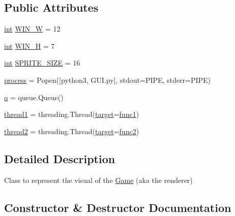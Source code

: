 \subsection*{Public Attributes}
\begin{DoxyCompactItemize}
\item 
\mbox{\hyperlink{warnings_8h_a74f207b5aa4ba51c3a2ad59b219a423b}{int}} \mbox{\hyperlink{class_game_a6af3a4730712fed523037d4a2cf0beab}{W\+I\+N\+\_\+W}} = 12
\item 
\mbox{\hyperlink{warnings_8h_a74f207b5aa4ba51c3a2ad59b219a423b}{int}} \mbox{\hyperlink{class_game_a59e081cafbf5991c96838c09806319f9}{W\+I\+N\+\_\+H}} = 7
\item 
\mbox{\hyperlink{warnings_8h_a74f207b5aa4ba51c3a2ad59b219a423b}{int}} \mbox{\hyperlink{class_game_a54d3bb2d75dd10ce20a72da67d73b898}{S\+P\+R\+I\+T\+E\+\_\+\+S\+I\+ZE}} = 16
\item 
\mbox{\hyperlink{class_game_a822fbaa2802a646fcdf2271bf422a6c6}{process}} = Popen(\mbox{[}\textquotesingle{}python3\textquotesingle{}, \textquotesingle{}G\+U\+I.\+py\textquotesingle{}\mbox{]}, stdout=P\+I\+PE, stderr=P\+I\+PE)
\item 
\mbox{\hyperlink{class_game_a6567b017dc559d77cb86f65b802c5913}{q}} = queue.\+Queue()
\item 
\mbox{\hyperlink{class_game_a6d717106010fb16b734c03c9b147d0a4}{thread1}} = threading.\+Thread(\mbox{\hyperlink{_s_d_l__opengl__glext_8h_af9d0cbbbeb7414e786c41899e5a856d7}{target}}=\mbox{\hyperlink{namespace_game_a0a46e1967198035abbe8eb1cde4d95ba}{func1}})
\item 
\mbox{\hyperlink{class_game_acc08a249af8743e6b07bf588cd94b930}{thread2}} = threading.\+Thread(\mbox{\hyperlink{_s_d_l__opengl__glext_8h_af9d0cbbbeb7414e786c41899e5a856d7}{target}}=\mbox{\hyperlink{namespace_game_ae3908fde602ee2498ff3e95476ae78ed}{func2}})
\end{DoxyCompactItemize}


\subsection{Detailed Description}
Class to represent the visual of the \mbox{\hyperlink{class_game}{Game}} (aka the renderer) 

\subsection{Constructor \& Destructor Documentation}
\mbox{\label{class_game_a12d537b50fbf7000e60c183411ac0142}} 
